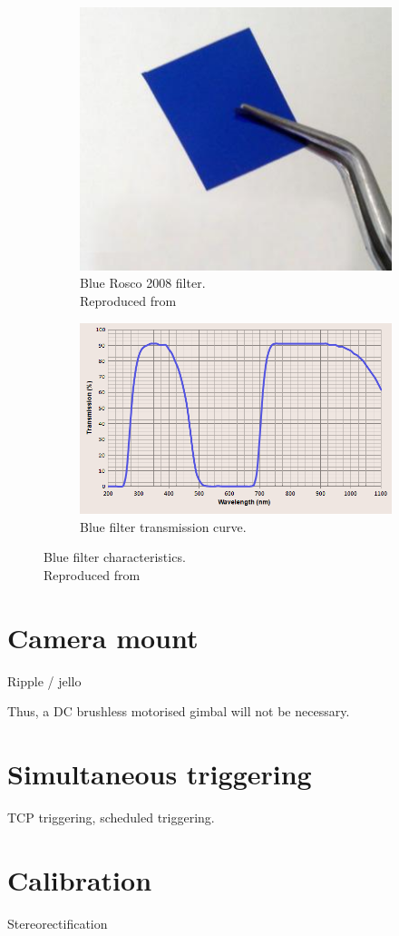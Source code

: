 \begin{figure}[H]
\begin{subfigure}{0.5\textwidth}
\centering
\includegraphics[scale=0.45]{images/blue_filter.jpg}
\caption{Blue Rosco 2008 filter.\\ Reproduced from \cite{blue_filter}}
\label{fig:blue_filter}
\end{subfigure}
\begin{subfigure}{0.5\textwidth}
\centering
\includegraphics[scale=0.42]{images/superblueinfraredfiltercurve.png}
\caption{Blue filter transmission curve.}
\label{fig:blue_curve}
\end{subfigure}
\caption{Blue filter characteristics.\\
Reproduced from \cite{blue_curve}}
\label{fig:blue_character}
\end{figure}

\section{Camera mount}

Ripple / jello

Thus, a DC brushless motorised gimbal will not be necessary.

\section{Simultaneous triggering}

TCP triggering, scheduled triggering.

\section{Calibration}

Stereorectification